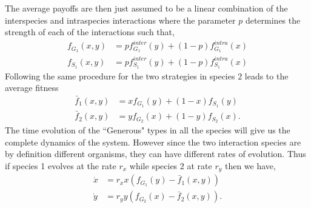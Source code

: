 \documentclass{pnastwo}
\begin{document}
\begin{article}
The average payoffs are then just assumed to be a linear combination of the interspecies and intraspecies interactions where the parameter $p$ determines the strength of each of the interactions such that,
%
\begin{align}
	f_{G_1} (x,y) &= p f^{inter}_{G_1} (y) + (1-p) f^{intra}_{G_1} (x) \\
	f_{S_1} (x,y) &= p f^{inter}_{S_1} (y) + (1-p) f^{intra}_{S_1} (x)
\label{fiteqs}
\end{align}
%
Following the same procedure for the two strategies in species $2$ leads to the average fitness
%
\begin{align}
\bar{f}_1 (x,y) &= x f_{G_1} (y)+(1-x) f_ {S_1}(y)\\
\bar{f}_2 (x,y) &= y f_{G_2} (x)+(1-y) f_{S_2}(x).
\label{avgfiteqs}
\end{align}
%
The time evolution of the ``Generous" types in all the species will give us the complete dynamics of the system.
However since the two interaction species are by definition different organisms, they can have different rates of evolution.
Thus if species 1 evolves at the rate $r_x$ while species 2 at rate $r_y$ then we have,
\begin{align}
\dot{x} &= r_x x \left(f_{G_1}(y) -  \bar{f}_1(x,y) \right) \nonumber \\
\dot{y} &= r_y y \left(f_{G_2}(x) -  \bar{f}_2(x,y) \right).
\label{eq:repeqs}
\end{align}



\end{article}
\end{document}

